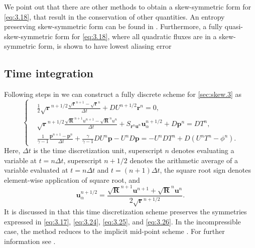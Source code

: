 We point out that there are other methods to obtain a skew-symmetric form for \eqref{eq:3.18}, that result in the conservation of other quantities. An entropy preserving skew-symmetric form can be found in \cite{sjogreen2010skew}. Furthermore, a fully quasi-skew-symmetric form for \eqref{eq:3.18}, where all quadratic fluxes are in a skew-symmetric form, is shown to have lowest aliasing error \cite{honein2004higher,honein2005numerical}

\subsection{Time integration}
Following steps in \cite{reiss2014conservative,morinishi2010skew} we can construct a fully discrete scheme for \eqref{sec:skew.3} as
\begin{equation} \label{eq:3.27}
	\left\{
	\begin{aligned}
	&\frac 1 2 \sqrt{\mathbf r} ^{n+1/2} \frac{\sqrt{\mathbf r}^{n+1} - \sqrt{\mathbf r}^{n}}{\Delta t} + DU^{n+1/2} \mathbf r^{n} = 0, \\
	& \sqrt{\mathbf r} ^{n+1/2}  \frac{\sqrt{ \mathbf R}^{n+1} u^{n+1} - \sqrt{\mathbf R}^{n}u^n}{\Delta t} + S_{\mathbf r^{n} \mathbf u^n} \mathbf u^{n+1/2}_\alpha + D \mathbf p^{n} = DT^{n}, \\
	& \frac 1 {\gamma -1} \frac{\mathbf p^{n+1} - \mathbf p^n}{\Delta t} + \frac{\gamma}{\gamma -1} D U^{n} \mathbf p - U^{n} D \mathbf p = - U^{n}D T^{n} + D (U^nT^n - \phi^n).
	\end{aligned}
	\right.
\end{equation}
Here, $\Delta t$ is the time discretization unit, superscript $n$ denotes evaluating a variable at $t = n\Delta t$, superscript $n+1/2$ denotes the arithmetic average of a variable evaluated at $t=n\Delta t$ and $t=(n+1)\Delta t$, the square root sign denotes element-wise application of square root, and 
\begin{equation}
	\mathbf u_{\alpha}^{n+1/2} = \frac{\sqrt{\mathbf R}^{n+1} \mathbf u^{n+1} + \sqrt{\mathbf R}^{n} \mathbf u^{n}}{2\sqrt{\mathbf r}^{n+1/2} }.
\end{equation}
It is discussed in \cite{reiss2014conservative} that this time discretization scheme preserves the symmetries expressed in \eqref{eq:3.17}, \eqref{eq:3.24}, \eqref{eq:3.25}, and \eqref{eq:3.26}. In the incompressible case, the method reduces to the implicit mid-point scheme \cite{hairer2006geometric}. For further information see \cite{reiss2014conservative,morinishi2010skew}.
